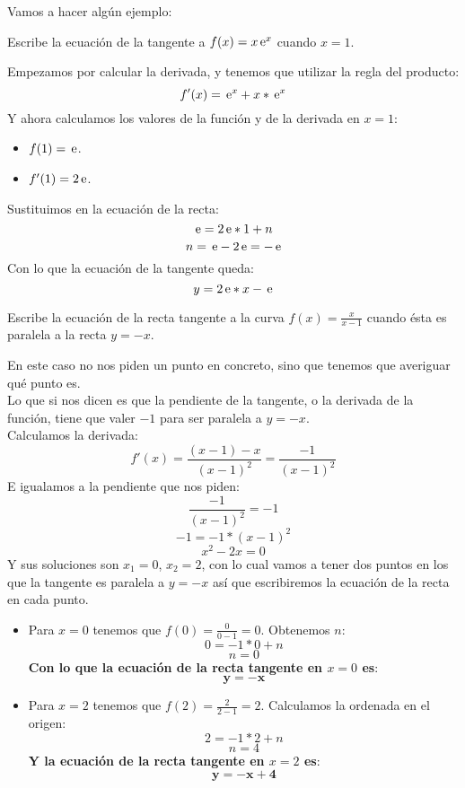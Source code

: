 \documentclass[a4paper,11pt,answers]{exam}
\begin{document}
Vamos a hacer algún ejemplo:
\begin{questions}
\question Escribe la ecuación de la tangente a $f(x) = x\,\mathrm{e}^x$ cuando $x=1$.
\begin{solution}
Empezamos por calcular la derivada, y tenemos que utilizar la regla del producto:
\[f'(x) = \,\mathrm{e}^x + x*\,\mathrm{e}^x \]
Y ahora calculamos los valores de la función y de la derivada en $x=1$:
\begin{itemize}
	\item $f(1) = \,\mathrm{e}$.
	\item $f'(1) = 2\,\mathrm{e}$.
\end{itemize}
Sustituimos en la ecuación de la recta:
\[\,\mathrm{e} = 2\,\mathrm{e}*1 + n\]
\[n = \,\mathrm{e} - 2\,\mathrm{e} = -\,\mathrm{e}\]
Con lo que la ecuación de la tangente queda:
\[y = 2\,\mathrm{e}*x - \,\mathrm{e}\]
\end{solution}

\question Escribe la ecuación de la recta tangente a la curva $f(x) = \frac{x}{x-1}$ cuando ésta es paralela a la recta $y=-x$.
\begin{solution}
En este caso no nos piden un punto en concreto, sino que tenemos que averiguar qué punto es.\\
Lo que si nos dicen es que la pendiente de la tangente, o la derivada de la función, tiene que valer $-1$ para ser paralela a $y=-x$.\\

Calculamos la derivada:
\[f'(x) = \frac{(x-1)-x}{(x-1)^2} = \frac{-1}{(x-1)^2}\]
E igualamos a la pendiente que nos piden:
\[\frac{-1}{(x-1)^2} = -1\]
\[-1 = -1*(x-1)^2\]
\[x^2 - 2x = 0\]
Y sus soluciones son $x_1 = 0$, $x_2=2$, con lo cual vamos a tener dos puntos en los que la tangente es paralela a $y=-x$ así que escribiremos la ecuación de la recta en cada punto.
\begin{itemize}
	\item Para $x=0$ tenemos que $f(0) = \frac{0}{0 - 1}= 0$. Obtenemos $n$:
	\[0 = -1*0 + n\]
	\[n = 0\]
	\textbf{Con lo que la ecuación de la recta tangente en $x=0$ es}:
	\[\boldsymbol{y = -x}\]
	\item Para $x=2$ tenemos que $f(2) = \frac{2}{2-1} = 2$. Calculamos la ordenada en el origen:
	\[2 = -1*2 + n\]
	\[n = 4\]
	\textbf{Y la ecuación de la recta tangente en $x=2$ es}:
	\[\boldsymbol{y = -x + 4}\]
\end{itemize}

\end{solution}

\end{questions}
\end{document}
